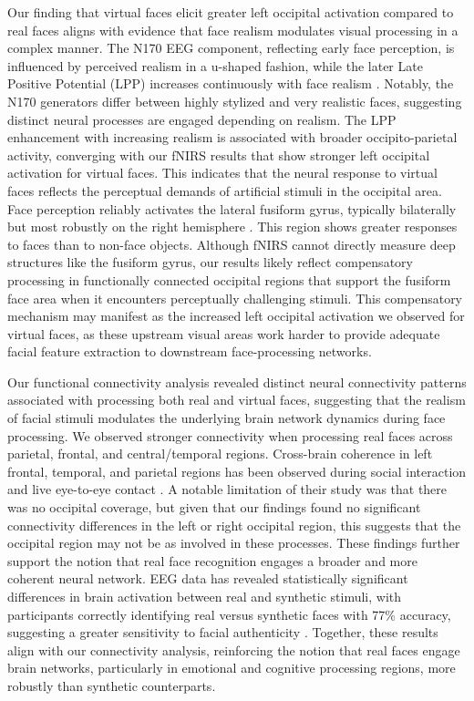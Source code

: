 Our finding that virtual faces elicit greater left occipital activation compared to real faces aligns with evidence that face realism modulates visual processing in a complex manner. 
The N170 EEG component, reflecting early face perception, is influenced by perceived realism in a u-shaped fashion, while the later Late Positive Potential (LPP) increases continuously with face realism \citep{schindler_differential_2017}. 
Notably, the N170 generators differ between highly stylized and very realistic faces, suggesting distinct neural processes are engaged depending on realism. 
The LPP enhancement with increasing realism is associated with broader occipito-parietal activity, converging with our fNIRS results that show stronger left occipital activation for virtual faces.
This indicates that the neural response to virtual faces reflects the perceptual demands of artificial stimuli in the occipital area. 
Face perception reliably activates the lateral fusiform gyrus, typically bilaterally but most robustly on the right hemisphere \citep{haxby_distributed_2000}. 
This region shows greater responses to faces than to non-face objects. 
Although fNIRS cannot directly measure deep structures like the fusiform gyrus, our results likely reflect compensatory processing in functionally connected occipital regions that support the fusiform face area when it encounters perceptually challenging stimuli. 
This compensatory mechanism may manifest as the increased left occipital activation we observed for virtual faces, as these upstream visual areas work harder to provide adequate facial feature extraction to downstream face-processing networks.

Our functional connectivity analysis revealed distinct neural connectivity patterns associated with processing both real and virtual faces, suggesting that the realism of facial stimuli modulates the underlying brain network dynamics during face processing.
We observed stronger connectivity when processing real faces across parietal, frontal, and central/temporal regions. 
Cross-brain coherence in left frontal, temporal, and parietal regions has been observed during social interaction and live eye-to-eye contact \citep{hirsch_frontal_2017}. 
A notable limitation of their study was that there was no occipital coverage, but given that our findings found no significant connectivity differences in the left or right occipital region, this suggests that the occipital region may not be as involved in these processes.
These findings further support the notion that real face recognition engages a broader and more coherent neural network. 
EEG data has revealed statistically significant differences in brain activation between real and synthetic stimuli, with participants correctly identifying real versus synthetic faces with 77\% accuracy, suggesting a greater sensitivity to facial authenticity \citep{tarchi_electroencephalographic_2023}. 
Together, these results align with our connectivity analysis, reinforcing the notion that real faces engage brain networks, particularly in emotional and cognitive processing regions, more robustly than synthetic counterparts.


